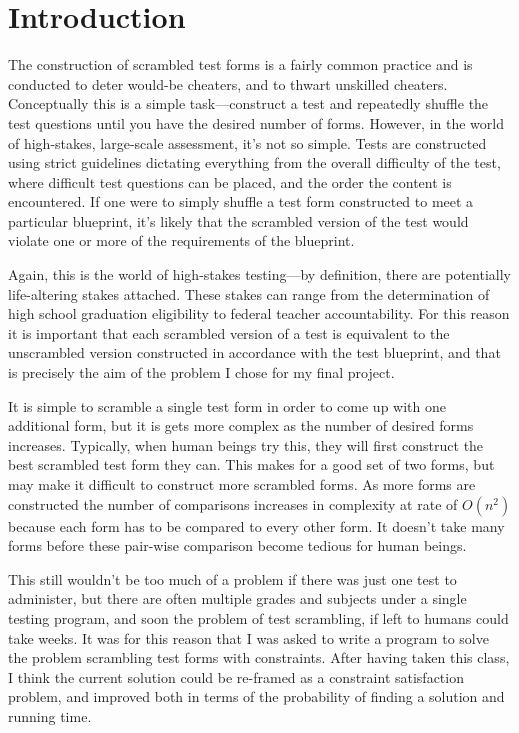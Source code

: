 \documentclass[11pt]{article}
\begin{document}
\section{Introduction}
\par
The construction of scrambled test forms is a fairly common practice
and is conducted to deter would-be cheaters, and to thwart unskilled
cheaters. Conceptually this is a simple task---construct a test and
repeatedly shuffle the test questions until you have the desired
number of forms.  However, in the world of high-stakes, large-scale
assessment, it's not so simple.  Tests are constructed using strict
guidelines dictating everything from the overall difficulty of the
test, where difficult test questions can be placed, and the order the
content is encountered. If one were to simply shuffle a test form
constructed to meet a particular blueprint, it's likely that the
scrambled version of the test would violate one or more of the
requirements of the blueprint.
\par
Again, this is the world of high-stakes testing---by definition, there
are potentially life-altering stakes attached. These stakes can range
from the determination of high school graduation eligibility to
federal teacher accountability. For this reason it is important that
each scrambled version of a test is equivalent to the unscrambled
version constructed in accordance with the test blueprint, and that is
precisely the aim of the problem I chose for my final project.
\par
It is simple to scramble a single test form in order to come up with
one additional form, but it is gets more complex as the number of
desired forms increases.  Typically, when human beings try this, they
will first construct the best scrambled test form they can. This makes
for a good set of two forms, but may make it difficult to construct
more scrambled forms. As more forms are constructed the number of
comparisons increases in complexity at rate of \(O(n^2)\)
because each form has to be compared to every other form.  It doesn't
take many forms before these pair-wise comparison become tedious for
human beings.
\par
This still wouldn't be too much of a problem if there was just one
test to administer, but there are often multiple grades and subjects
under a single testing program, and soon the problem of test
scrambling, if left to humans could take weeks. It was for this reason
that I was asked to write a program to solve the problem scrambling
test forms with constraints. After having taken this class, I think
the current solution could be re-framed as a constraint satisfaction
problem, and improved both in terms of the probability of finding a
solution and running time.
\end{document}
